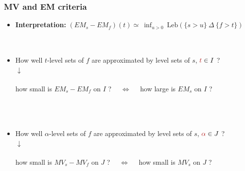 \documentclass[10pt]{beamer}
\newcommand\red{\color{red} }
\newcommand\blue{\color{blue} }
\def\leb{\text{Leb}}
\begin{document}
\begin{frame}
\frametitle{MV and EM criteria}
\begin{itemize}
\item \textbf{Interpretation:} $(EM_s - EM_f)(t) \simeq ~\inf_{u>0}~ \leb(\{ s >u\}~\Delta~\{f>t\})$ \\~\\~\\


\item How well {\red $t$}-level sets of $f$ are approximated by level sets of $s$, ${\red t} \in I$ ? \\
{\centering $\downarrow$\\~\\
how {\blue small} is $EM_s - EM_f$ on $I$ ? ~~$\Leftrightarrow$~~ how {\blue large} is $EM_s$ on $I$ ?\\~\\~\\~\\}

\item How well {\red $\alpha$}-level sets of $f$ are approximated by level sets of $s$, ${\red \alpha} \in J$ ? \\
{\centering $\downarrow$\\~\\
 how {\blue small} is $MV_s - MV_f$ on $J$ ? ~~$\Leftrightarrow$~~  how {\blue small} is $MV_s$ on $J$ ?\\}
 
\end{itemize}


\end{frame}
\end{document}
